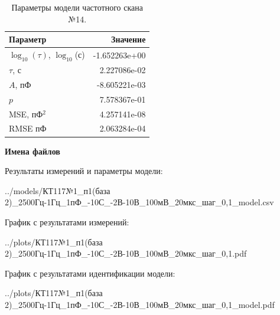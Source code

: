 \begin{table}[!ht]
    \centering
    \caption{Параметры модели частотного скана №14.}
    \begin{tabular}{|l|r|}
        \hline
        Параметр                                       & Значение                  \\ \hline
        $\log_{10}(\tau)$, $\log_{10}$(с)              & -1.652263e+00             \\ \hline
        $\tau$, с                                      & 2.227086e-02              \\ \hline
        $A$, пФ                                        & -8.605221e-03             \\ \hline
        $p$                                            & 7.578367e-01              \\ \hline
        MSE, пФ$^2$                                    & 4.257141e-08              \\ \hline
        RMSE пФ                                        & 2.063284e-04              \\ \hline
    \end{tabular}
    \label{table:frequency_scan_model_14}
\end{table}

\textbf{Имена файлов}

Результаты измерений и параметры модели:

\scriptsize../models/КТ117№1\_п1(база 2)\_2500Гц-1Гц\_1пФ\_-10С\_-2В-10В\_100мВ\_20мкс\_шаг\_0,1\_model.csv
\normalsize

График с результатами измерений:

\scriptsize../plots/КТ117№1\_п1(база 2)\_2500Гц-1Гц\_1пФ\_-10С\_-2В-10В\_100мВ\_20мкс\_шаг\_0,1.pdf
\normalsize

График с результатами идентификации модели:

\scriptsize../plots/КТ117№1\_п1(база 2)\_2500Гц-1Гц\_1пФ\_-10С\_-2В-10В\_100мВ\_20мкс\_шаг\_0,1\_model.pdf
\normalsize

